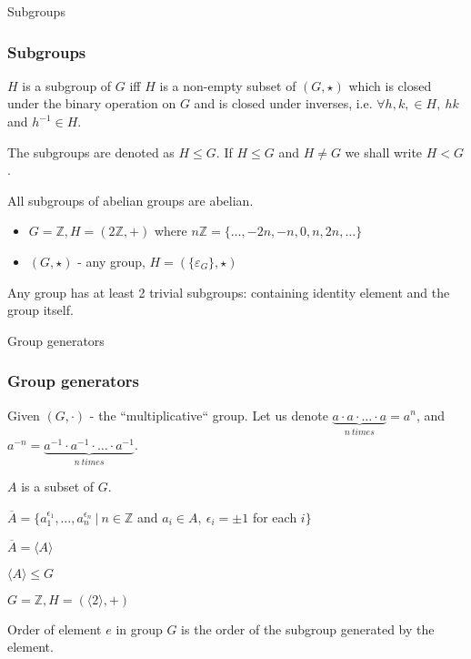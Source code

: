 \documentclass{beamer}
\begin{document}
\begin{frame}{Subgroups}
	\subsubsection{Subgroups}
	\begin{definition}[of subgroup]
		$H$ is a subgroup of $G$ iff $H$ is a non-empty subset of $(G, \star)$ which is closed under the binary 
		operation on $G$ and is closed under inverses, i.e. $\forall h, k, \in H, \ hk$ and $h^{-1} \in H$. 
		
		The	subgroups are denoted as $H \le G$. If $H \le G$ and $H \ne G$ we shall write $H < G$.
	\end{definition}
	\begin{prop}
		All subgroups of abelian groups are abelian.
	\end{prop}
	\begin{example}
		\begin{itemize}
			\item $G = \mathbb{Z}, H = (2\mathbb{Z}, +)$ \newline
			where $n\mathbb{Z} = \{\ldots, -2n, -n, 0, n, 2n, \ldots\}$
			\item $(G, \star)$ - any group, $H = (\{\varepsilon_G\}, \star)$
		\end{itemize}
	\end{example}
	Any group has at least 2 trivial subgroups: containing identity element and the group itself.
\end{frame}

\begin{frame}{Group generators}
	\subsubsection{Group generators}
	\begin{definition}
		Given $(G, \cdot)$ - the ``multiplicative`` group. \newline
		Let us denote $\underbrace{a \cdot a \cdot \ldots \cdot a}_{n\ times} = a^n$, and \newline
		$a^{-n} = \underbrace{a^{-1} \cdot a^{-1} \cdot \ldots \cdot a^{-1}}_{n\ times}$.
	\end{definition}
	\begin{definition}
		$A$ is a subset of $G$.

		$\overline{A} = \{a_1^{\epsilon_1},\ldots, a_n^{\epsilon_n}\ \vert\ n \in \mathbb{Z}$ and $a_i \in A,\ 
		\epsilon_i = \pm 1$ for each $i \}$
		
		$\overline{A} = \langle A \rangle$ 
	\end{definition}
	$\langle A \rangle \le G$
	\begin{example}
		$G = \mathbb{Z}, H = (\langle 2 \rangle, +)$
	\end{example}
	\begin{definition}
		Order of element $e$ in group $G$ is the order of the subgroup generated by the element.
	\end{definition}
\end{frame}
\end{document}
